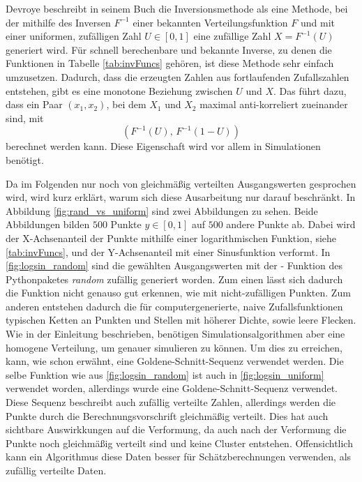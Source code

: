Devroye \cite{devroye-non_uniform_random_variate-1986} beschreibt in seinem Buch 
die Inversionsmethode als eine Methode, bei der mithilfe des Inversen $F^{-1}$ 
einer bekannten Verteilungsfunktion $F$ und mit einer uniformen, zufälligen Zahl 
$U \in [0, 1]$ eine zufällige Zahl $X = F^{-1}(U)$ generiert wird. Für schnell 
berechenbare und bekannte Inverse, zu denen die Funktionen in Tabelle 
\ref{tab:invFuncs} gehören, ist diese Methode sehr einfach umzusetzen. Dadurch, 
dass die erzeugten Zahlen aus fortlaufenden Zufallszahlen entstehen, gibt es eine 
monotone Beziehung zwischen $U$ und $X$. Das führt dazu, dass ein Paar 
$(x_1, x_2)$, bei dem $X_1$ und $X_2$ maximal anti-korreliert zueinander sind, mit 
\begin{equation}
    (F^{-1}(U),\, F^{-1}(1 - U))
\end{equation}
berechnet werden kann. Diese Eigenschaft wird vor allem in Simulationen benötigt.

Da im Folgenden nur noch von gleichmäßig verteilten Ausgangswerten gesprochen 
wird, wird kurz erklärt, warum sich diese Ausarbeitung nur darauf beschränkt. In 
Abbildung \ref{fig:rand_vs_uniform} sind zwei Abbildungen zu sehen. Beide 
Abbildungen bilden $500$ Punkte $y \in [0, 1]$ auf $500$ andere Punkte ab. Dabei 
wird der X-Achsenanteil der Punkte mithilfe einer logarithmischen Funktion, siehe 
\ref{tab:invFuncs}, und der Y-Achsenanteil mit einer Sinusfunktion verformt. In 
\ref{fig:logsin_random} sind die gewählten Ausgangswerten mit der -
Funktion des Pythonpaketes \textit{random} zufällig generiert worden. Zum einen 
lässt sich dadurch die Funktion nicht genauso gut erkennen, wie mit nicht-zufälligen 
Punkten. Zum anderen entstehen dadurch die für computergenerierte, naive 
Zufallsfunktionen typischen Ketten an Punkten und Stellen mit höherer Dichte, 
sowie leere Flecken. Wie in der Einleitung beschrieben, benötigen 
Simulationsalgorithmen aber eine homogene Verteilung, um genauer simulieren zu können. 
Um dies zu erreichen, kann, wie schon erwähnt, eine Goldene-Schnitt-Sequenz verwendet 
werden. Die selbe Funktion wie aus \ref{fig:logsin_random} ist auch in \ref{fig:logsin_uniform} 
verwendet worden, allerdings wurde eine Goldene-Schnitt-Sequenz verwendet. Diese 
Sequenz beschreibt auch zufällig verteilte Zahlen, allerdings werden die Punkte 
durch die Berechnungsvorschrift gleichmäßig verteilt. Dies hat auch sichtbare Auswirkkungen 
auf die Verformung, da auch nach der Verformung die Punkte noch gleichmäßig verteilt 
sind und keine Cluster entstehen. Offensichtlich kann ein Algorithmus diese Daten 
besser für Schätzberechnungen verwenden, als zufällig verteilte Daten.

